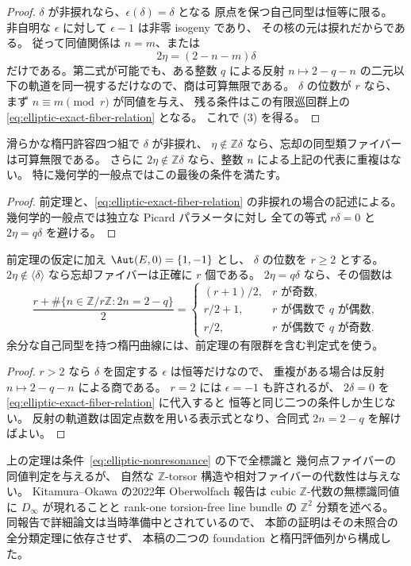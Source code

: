 \begin{proof}
$\delta$ が非捩れなら、$\epsilon(\delta)=\delta$ となる
原点を保つ自己同型は恒等に限る。
非自明な $\epsilon$ に対して $\epsilon-1$ は非零 isogeny であり、
その核の元は捩れだからである。
従って同値関係は $n=m$、または
\[
 2\eta=(2-n-m)\delta
\]
だけである。第二式が可能でも、ある整数 $q$ による反射
$n\mapsto 2-q-n$ の二元以下の軌道を同一視するだけなので、商は可算無限である。
$\delta$ の位数が $r$ なら、まず $n\equiv m\pmod r$ が同値を与え、
残る条件はこの有限巡回群上の \eqref{eq:elliptic-exact-fiber-relation} となる。
これで (3) を得る。
\end{proof}

\begin{corollary}[一般楕円型における忘却の可算無限ファイバー]
\label{thm:generic-elliptic-unpointed-fiber}
滑らかな楕円許容四つ組で $\delta$ が非捩れ、
$\eta\notin\mathbb Z\delta$ なら、忘却の同型類ファイバーは可算無限である。
さらに $2\eta\notin\mathbb Z\delta$ なら、整数 $n$ による上記の代表に重複はない。
特に幾何学的一般点ではこの最後の条件を満たす。
\end{corollary}
\begin{proof}
前定理と、\eqref{eq:elliptic-exact-fiber-relation} の非捩れの場合の記述による。
幾何学的一般点では独立な Picard パラメータに対し
全ての等式 $r\delta=0$ と $2\eta=q\delta$ を避ける。
\end{proof}

\begin{corollary}[余分な楕円自己同型がない捩れの場合の濃度]
\label{cor:elliptic-torsion-fiber-cardinality}
前定理の仮定に加え $\Aut(E,0)=\{1,-1\}$ とし、
$\delta$ の位数を $r\ge2$ とする。
$2\eta\notin\langle\delta\rangle$ なら忘却ファイバーは正確に $r$ 個である。
$2\eta=q\delta$ なら、その個数は
\[
 \frac{r+\#\{n\in\mathbb Z/r\mathbb Z:2n=2-q\}}2
 =\begin{cases}
   (r+1)/2,&r\text{ が奇数},\\
   r/2+1,&r\text{ が偶数で }q\text{ が偶数},\\
   r/2,&r\text{ が偶数で }q\text{ が奇数}.
  \end{cases}
\]
余分な自己同型を持つ楕円曲線には、前定理の有限群を含む判定式を使う。
\end{corollary}
\begin{proof}
$r>2$ なら $\delta$ を固定する $\epsilon$ は恒等だけなので、
重複がある場合は反射 $n\mapsto2-q-n$ による商である。
$r=2$ には $\epsilon=-1$ も許されるが、
$2\delta=0$ を \eqref{eq:elliptic-exact-fiber-relation} に代入すると
恒等と同じ二つの条件しか生じない。
反射の軌道数は固定点数を用いる表示式となり、合同式 $2n=2-q$ を解けばよい。
\end{proof}

\begin{remark}[既存研究と残る問題]
上の定理は条件~\eqref{eq:elliptic-nonresonance} の下で全標識と
幾何点ファイバーの同値判定を与えるが、
自然な $\mathbb Z$-torsor 構造や相対ファイバーの代数性は与えない。
Kitamura--Okawa の2022年 Oberwolfach 報告\cite{OkawaKitamura2022OWR}は
cubic $\mathbb Z$-代数の無標識同値に $D_\infty$ が現れることと
rank-one torsion-free line bundle の $\mathbb Z^2$ 分類を述べる。
同報告で詳細論文は当時準備中とされているので、
本節の証明はその未照合の全分類定理に依存させず、
本稿の二つの foundation と楕円評価列から構成した。
\end{remark}
